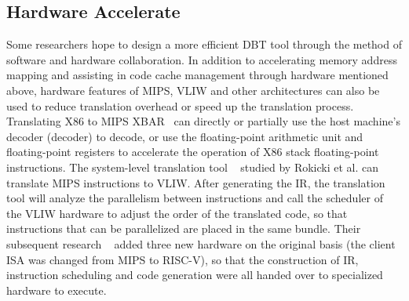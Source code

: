 \subsection{Hardware Accelerate}
Some researchers hope to design a more efficient DBT tool through the method of software and hardware collaboration.
In addition to accelerating memory address mapping and assisting in code cache management through hardware mentioned above, hardware features of MIPS, VLIW and other architectures can also be used to reduce translation overhead or speed up the translation process.
Translating X86 to MIPS XBAR~\cite{Hu2009EfficientBT} can directly or partially use the host machine's decoder (decoder) to decode, or use the floating-point arithmetic unit and floating-point registers to accelerate the operation of X86 stack floating-point instructions.
The system-level translation tool ~\cite{Rokicki2017HardwareacceleratedDB} studied by Rokicki et al. can translate MIPS instructions to VLIW.
After generating the IR, the translation tool will analyze the parallelism between instructions and call the scheduler of the VLIW hardware to adjust the order of the translated code, so that instructions that can be parallelized are placed in the same bundle.
Their subsequent research ~\cite{Rokicki2019HybridDBTHD} added three new hardware on the original basis (the client ISA was changed from MIPS to RISC-V), so that the construction of IR, instruction scheduling and code generation were all handed over to specialized hardware to execute.
